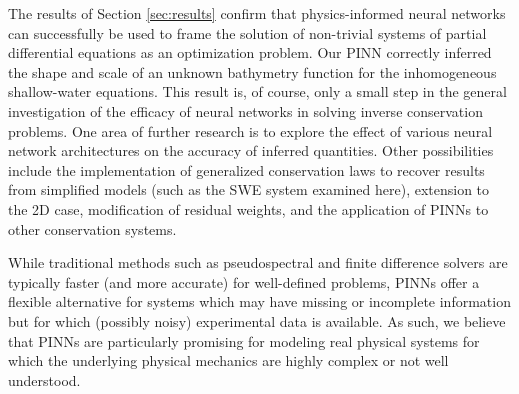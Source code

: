 The results of Section \ref{sec:results} confirm that physics-informed neural networks can successfully be used to frame
the solution of non-trivial systems of partial differential equations as an optimization problem. Our PINN correctly 
inferred the shape and scale of an unknown bathymetry function for the inhomogeneous shallow-water equations. This 
result is, of course, only a small step in the general investigation of the efficacy of neural networks in solving 
inverse conservation problems. One area of further research is to explore the effect of various neural network 
architectures on the accuracy of inferred quantities. Other possibilities include the implementation of generalized 
conservation laws to recover results from simplified models (such as the SWE system examined here), extension to the 2D
case, modification of residual weights, and the application of PINNs to other conservation systems.

While traditional methods such as pseudospectral and finite 
difference solvers are typically faster (and more accurate) for well-defined problems, PINNs offer a flexible 
alternative for systems which may have missing or incomplete information but for which (possibly noisy) experimental 
data is available. As such, we believe that PINNs are particularly promising for modeling real physical systems for 
which the underlying physical mechanics are highly complex or not well understood. 

